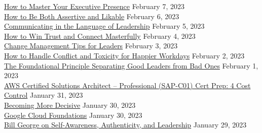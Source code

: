 \documentclass[10pt]{res} %
\begin{document}
\begin{resume}
\href{https://www.linkedin.com/learning/certificates/5c3ab32cfbd45af34fa38734c7817acaae37f3c4d37728880c188d5985d802f7}{\color{blue}How to Master Your Executive Presence} \hfill February 7, 2023 \\
\href{https://www.linkedin.com/learning/certificates/eb8bbbf628e962e64a572af4ac0c7a91ff6d397467c670a26486d18037e9c059}{\color{blue}How to Be Both Assertive and Likable} \hfill February 6, 2023 \\
\href{https://www.linkedin.com/learning/certificates/aff5e0c0f27c4e4992ff4b9b421b8985bb02976cd2ef27f3fc10049888755d03}{\color{blue}Communicating in the Language of Leadership} \hfill February 5, 2023 \\
\href{https://www.linkedin.com/learning/certificates/5f6c78204689de3e5fab79cedfc42ac649f091768a2d1c547e97e3cee73f2cbc}{\color{blue}How to Win Trust and Connect Masterfully} \hfill February 4, 2023 \\
\href{https://www.linkedin.com/learning/certificates/f9c4df696387578c6bb6de8767dbec8117b607e8ce4f6bc18c88fb697aee5334}{\color{blue}Change Management Tips for Leaders} \hfill February 3, 2023 \\
\href{https://www.linkedin.com/learning/certificates/7700c8ad2aabb1828fed22c7b74591e76e1ba255c67a0890f0e2a95037ced761}{\color{blue}How to Handle Conflict and Toxicity for Happier Workdays} \hfill February 2, 2023 \\
\href{https://www.linkedin.com/learning/certificates/97682138397ded5bb6a5566e7c4fbdd3e8c7d813dd7912c24788ea3a7fb5b8cb}{\color{blue}The Foundational Principle Separating Good Leaders from Bad Ones} \hfill February 1, 2023 \\
\href{https://www.linkedin.com/learning/certificates/377dc8604fc501a7c347cc680f5e08f10263e6a3c4e8f5872d87a5d431181f82}{\color{blue}AWS Certified Solutions Architect -- Professional (SAP-C01) Cert Prep: 4 Cost Control} \hfill January 31, 2023 \\
\href{https://www.linkedin.com/learning/certificates/838751f40948979ad7dd3eb5a0f78ac196a89640c73ae1a7b3a5fc66720f5e8b}{\color{blue}Becoming More Decisive} \hfill January 30, 2023 \\
\href{https://www.linkedin.com/learning/certificates/cbeea2794e49c55458b4296e8ec6bec3a703d0160d4694164747e388ca11fa80}{\color{blue}Google Cloud Foundations} \hfill January 30, 2023 \\
\href{https://www.linkedin.com/learning/certificates/fce92ad96422cfbb43fa999f0fe840b650c38e17d4a6122f5799fa035b4b2796}{\color{blue}Bill George on Self-Awareness, Authenticity, and Leadership} \hfill January 29, 2023 \\

\end{resume}
\end{document}
